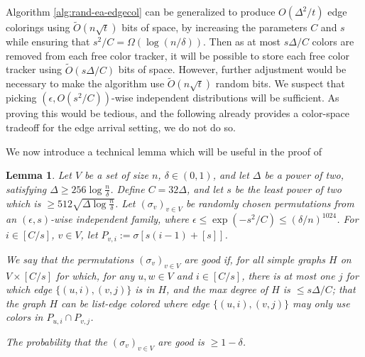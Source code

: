 \documentclass[10pt]{article}
\newtheorem{lemma}[theorem]{Lemma}
\theoremstyle{definition}\newtheorem{definition}[lemma]{Definition}
\theoremstyle{remark}  \newtheorem*{remark}{Remark}
\newcommand{\tO}{\widetilde{O}}
\begin{document}
Algorithm \ref{alg:rand-ea-edgecol} can be generalized to produce $O(\Delta^2 / t)$ edge colorings using $\tO(n \sqrt{t})$ bits of space, by increasing the parameters $C$ and $s$ while ensuring that $s^2 / C = \Omega(\log (n/\delta))$. Then as at most $s \Delta / C$ colors are removed from each free color tracker, it will be possible to store each free color tracker using $\tO(s \Delta / C)$ bits of space. However, further adjustment would be necessary to make the algorithm use $\tO(n \sqrt{t})$ random bits. We suspect that picking $(\epsilon,O(s^2/C))$-wise independent distributions will be sufficient. As proving this would be tedious, and the following  already provides a color-space tradeoff for the edge arrival setting, we do not do so.

We now introduce a technical lemma which will be useful in the proof of 

\begin{lemma}\label{lem:offline-ea-coloring}
  Let $V$ be a set of size $n$, $\delta \in (0,1)$, and let $\Delta$ be a power of two, satisfying $\Delta \ge 256 \log \frac{n}{\delta}$. Define $C = 32 \Delta$, and let $s$ be the least power of two which is $\ge 512 \sqrt{\Delta \log \frac{n}{\delta}}$. Let $(\sigma_v)_{v \in V}$ be randomly chosen permutations from an $(\epsilon, s)$-wise independent family, where $\epsilon \le \exp(- s^2/C) \le (\delta/n)^{1024}$. For $i \in [C / s]$, $v \in V$, let $P_{v,i} := \sigma[s (i-1) + [s]]$.
  
  We say that the permutations $(\sigma_v)_{v \in V}$ are \emph{good} if, for all simple graphs $H$ on $V \times [C/s]$ for which, for any $u,w\in V$ and $i \in [C/s]$, there is at most one $j$ for which edge $\{(u,i),(v,j)\}$ is in $H$, and the max degree of $H$ is $\le s \Delta / C$; that the graph $H$ can be list-edge colored where edge $\{(u,i),(v,j)\}$ may only use colors in $P_{u,i} \cap P_{v,j}$.
  
  The probability that the $(\sigma_v)_{v \in V}$ are \emph{good} is $\ge 1 - \delta$.
\end{lemma}
\end{document}
